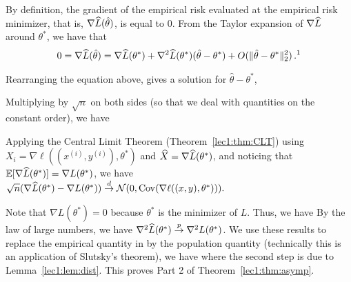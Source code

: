 By definition, the gradient of the empirical risk evaluated at the empirical risk minimizer, that is, $\nabla \widehat{L}(\hat{\theta})$, is equal to $0$. From the Taylor expansion of $\nabla \widehat{L}$ around $\theta^*$, we have that 
\begin{align}
    0 = \nabla \hatL(\hat{\theta}) = \nabla \hatL(\theta^*) + \nabla^2 \hatL(\theta^*)(\hat{\theta} - \theta^*) + O(\|\hat{\theta} - \theta^*\|^2_2)\perm\text{\footnotemark}
\end{align}

Rearranging the equation above, gives a solution for $\hat{\theta}-\theta^*$, 

Multiplying by $\sqrt{n}$ on both sides (so that we deal with quantities on the constant order), we have

 
Applying the Central Limit Theorem (Theorem~\ref{lec1:thm:CLT}) using $X_i = \nabla \ell ((x^{(i)}, y^{(i)}), \theta^*)$ and $\widehat{X} = \nabla \widehat{L}(\theta^*)$, and noticing that $\operatorname*{\mathbb{E}}[\nabla \widehat{L}(\theta^{*})] = \nabla L(\theta^{*})$, we have
$\sqrt{n} (\nabla \widehat{L}(\theta^{*}) - \nabla L(\theta^{*})) \overset{d}{\to} \mathcal{N}(0,\operatorname{Cov}(\nabla \ell((x, y), \theta^{*}))).$ 
 
Note that $\nabla L(\theta^{*}) = 0$ because $\theta^{*}$ is the minimizer of  $L$. Thus, we have 
By the law of large numbers, we have $\nabla^2 \widehat{L}(\theta^*) \stackrel{p}{\rightarrow} \nabla^2 L(\theta^*)$. We use these results to replace the empirical quantity in  by the population quantity (technically this is an application of Slutsky's theorem), we have
where the second step is due to Lemma~\ref{lec1:lem:dist}. This proves Part 2 of Theorem~\ref{lec1:thm:asymp}.


